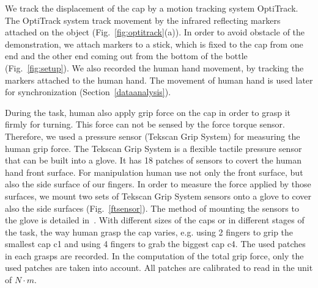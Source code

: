 \documentclass[preprint,12pt]{elsarticle}
\begin{document}
We track the displacement of the cap by a motion tracking system OptiTrack. The OptiTrack system track movement by the infrared reflecting markers attached on the object (Fig.~\ref{fig:optitrack}(a)). In order to avoid obstacle of the demonstration, we attach markers to a stick, which is fixed to the cap from one end and the other end coming out from the bottom of the bottle (Fig.~\ref{fig:setup}). We also recorded the human hand movement, by tracking the markers attached to the human hand. The movement of human hand is used later for synchronization (Section~\ref{dataanalysis}).

During the task, human also apply grip force on the cap in order to grasp it firmly for turning. This force can not be sensed by the force torque sensor. Therefore, we used a pressure sensor (Tekscan Grip System) for measuring the human grip force. The Tekscan Grip System is a flexible tactile pressure sensor that can be built into a glove. It has 18 patches of sensors to covert the human hand front surface. For manipulation human use not only the front surface, but also the side surface of our fingers. In order to measure the force applied by those surfaces, we mount two sets of Tekscan Grip System sensors onto a glove to cover also the side surfaces (Fig.~\ref{ftsensor}). The method of mounting the sensors to the glove is detailed in~\cite{deSouza2014}. With different sizes of the caps or in different stages of the task, the way human grasp the cap varies, e.g. using 2 fingers to grip the smallest cap c1 and using 4 fingers to grab the biggest cap c4. The used patches in each grasps are recorded. In the computation of the total grip force, only the used patches are taken into account. All patches are calibrated to read in the unit of $N{\cdot}m$.




%
\end{document}
